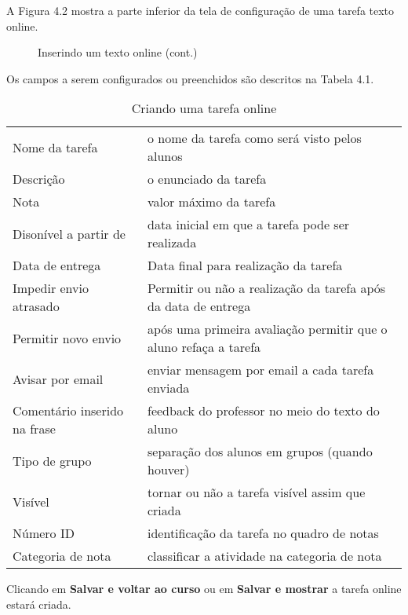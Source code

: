 A Figura 4.2 mostra a parte inferior da tela de configuração de uma tarefa texto online.

\begin{figure}
 \begin{center}
  \caption{Inserindo um texto online (cont.)}
 \end{center}
\end{figure}

Os campos a serem configurados ou preenchidos são descritos na Tabela 4.1.

\begin{table}
 \begin{center}
  \begin{tabular}{m{4.5cm} m{9.5cm}} \\
  Nome da tarefa & o nome da tarefa como será visto pelos alunos \\
  Descrição & o enunciado da tarefa \\
  Nota & valor máximo da tarefa \\
  Disonível a partir de & data inicial em que a tarefa pode ser realizada \\
  Data de entrega &  Data final para realização da tarefa \\
  Impedir envio atrasado & Permitir ou não a realização da tarefa após da data de entrega \\
  Permitir novo envio & após uma primeira avaliação permitir que o aluno refaça a tarefa \\
  Avisar por email & enviar mensagem por email a cada tarefa enviada \\
  Comentário inserido na frase & feedback do professor no meio do texto do aluno \\
  Tipo de grupo & separação dos alunos em grupos (quando houver) \\
  Visível & tornar ou não a tarefa visível assim que criada \\
  Número ID & identificação da tarefa no quadro de notas \\
  Categoria de nota & classificar a atividade na categoria de nota \\ \hline
 \end{tabular}
 \caption{Criando uma tarefa online}
 \end{center}
\end{table}

Clicando em \textbf{Salvar e voltar ao curso} ou em \textbf{Salvar e mostrar} a tarefa online estará criada.

